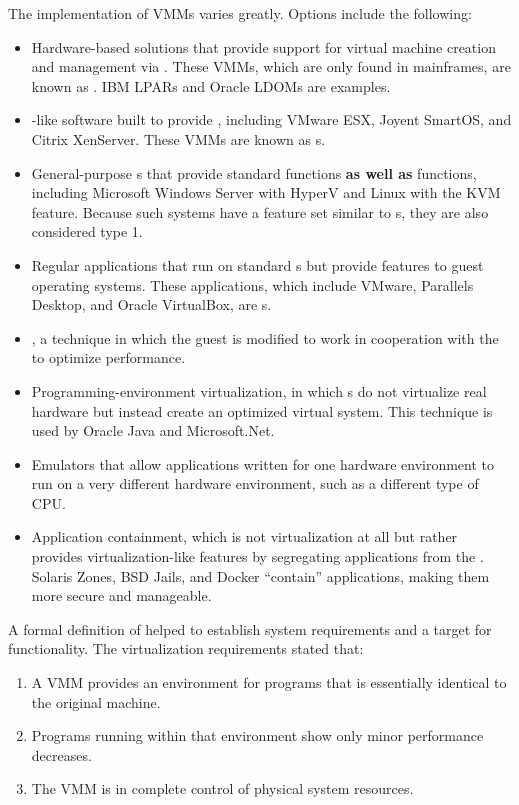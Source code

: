 The implementation of VMMs varies greatly. Options include the following:
\begin{itemize}[noitemsep]
\item Hardware-based solutions that provide support for virtual machine creation and management via .
  These VMMs, which are only found in mainframes, are known as .
  IBM LPARs and Oracle LDOMs are examples.
\item {}-like software built to provide , including VMware ESX, Joyent SmartOS, and Citrix XenServer.
  These VMMs are known as s.
\item General-purpose s that provide standard functions \textbf{as well as}  functions, including Microsoft Windows Server with HyperV and Linux with the KVM feature.
  Because such systems have a feature set similar to s, they are also considered type 1.
\item Regular applications that run on standard s but provide  features to guest operating systems.
  These applications, which include VMware, Parallels Desktop, and Oracle VirtualBox, are s.
\item {}, a technique in which the guest  is modified to work in cooperation with the  to optimize performance.
\item Programming-environment virtualization, in which s do not virtualize real hardware but instead create an optimized virtual system.
  This technique is used by Oracle Java and Microsoft.Net.
\item Emulators that allow applications written for one hardware environment to run on a very different hardware environment, such as a different type of CPU.\@
\item Application containment, which is not virtualization at all but rather provides virtualization-like features by segregating applications from the .
  Solaris Zones, BSD Jails, and Docker ``contain'' applications, making them more secure and manageable.
\end{itemize}

A formal definition of  helped to establish system requirements and a target for functionality.
The virtualization requirements stated that:
\begin{enumerate}[noitemsep]
\item A VMM provides an environment for programs that is essentially identical to the original machine.
\item Programs running within that environment show only minor performance decreases.
\item The VMM is in complete control of physical system resources.
\end{enumerate}

